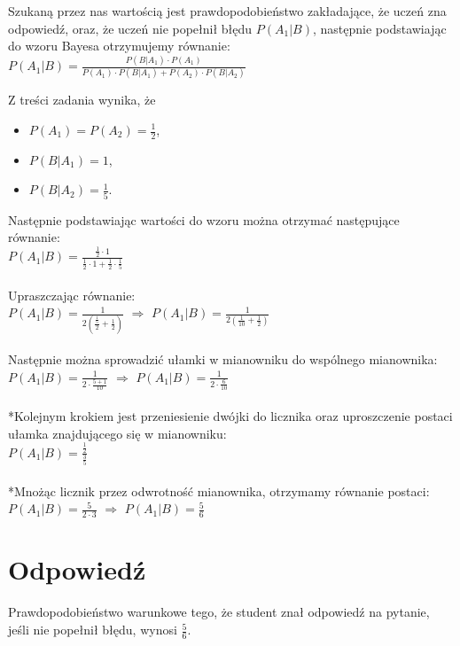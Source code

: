 \documentclass[UTF8]{article}
\begin{document}
\bigskip
\noindent Szukaną przez nas wartością jest prawdopodobieństwo zakładające, że uczeń zna odpowiedź, oraz, że uczeń nie popełnił błędu $P(A_{1}|B)$, następnie podstawiając do wzoru Bayesa otrzymujemy równanie:
\\$P(A_{1}|B) = \frac{P(B|A_{1}) \cdot P(A_{1})}{P(A_{1}) \cdot P(B|A_{1}) + P(A_{2}) \cdot P(B|A_{2})}$

\bigskip 
\noindent Z treści zadania wynika, że 
\begin{itemize}
	\item $P(A_{1}) = P(A_{2}) = \frac{1}{2}$, 
	\item $P(B|A_{1}) = 1$,
	\item $P(B|A_{2}) = \frac{1}{5}$.
\end{itemize}
Następnie podstawiając wartości do wzoru można otrzymać następujące równanie:\\
$P(A_{1}|B) = \frac{\frac{1}{2} \cdot 1}{\frac{1}{2} \cdot 1 + \frac{1}{2} \cdot \frac{1}{5}}$\\
\\Upraszczając równanie:
\\$P(A_{1}|B) = \frac{1}{2(\frac{\frac{1}{5}}{2} + \frac{1}{2})}$ $\Rightarrow$ $P(A_{1}|B) = \frac{1}{2(\frac{1}{10} + \frac{1}{2})}$ \\
\\Następnie można sprowadzić ułamki w mianowniku do wspólnego mianownika:
\\$P(A_{1}|B) = \frac{1}{2\cdot \frac{5+1}{10}}$ $\Rightarrow$ $P(A_{1}|B) = \frac{1}{2 \cdot \frac{6}{10}}$\\
\\*Kolejnym krokiem jest przeniesienie dwójki do licznika oraz uproszczenie postaci ułamka znajdującego się w mianowniku:
\\$P(A_{1}|B) = \frac{\frac{1}{2}}{\frac{3}{5}}$\\
\\*Mnożąc licznik przez odwrotność mianownika, otrzymamy równanie postaci:
\\$P(A_{1}|B) = \frac{5}{2 \cdot 3}$ $\Rightarrow$ $P(A_{1}|B) = \frac{5}{6}$

\newpage

\section{Odpowiedź}
Prawdopodobieństwo warunkowe tego, że student znał odpowiedź na pytanie, jeśli nie popełnił błędu, wynosi $\frac{5}{6}$.
\end{document}
